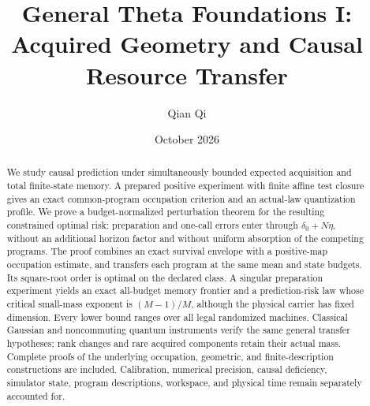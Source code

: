 \documentclass[11pt,reqno]{amsart}
\title[Acquired geometry and causal resource transfer]{General Theta Foundations I:\\Acquired Geometry and Causal Resource Transfer}
\author{Qian Qi}
\date{October 2026}
\numberwithin{equation}{section}
\theoremstyle{definition}
\theoremstyle{remark}
\begin{document}
\begin{abstract}
We study causal prediction under simultaneously bounded expected acquisition and total finite-state memory. A prepared positive experiment with finite affine test closure gives an exact common-program occupation criterion and an actual-law quantization profile. We prove a budget-normalized perturbation theorem for the resulting constrained optimal risk: preparation and one-call errors enter through $\delta_0+N\eta$, without an additional horizon factor and without uniform absorption of the competing programs. The proof combines an exact survival envelope with a positive-map occupation estimate, and transfers each program at the same mean and state budgets. Its square-root order is optimal on the declared class. A singular preparation experiment yields an exact all-budget memory frontier and a prediction-risk law whose critical small-mass exponent is $(M-1)/M$, although the physical carrier has fixed dimension. Every lower bound ranges over all legal randomized machines. Classical Gaussian and noncommuting quantum instruments verify the same general transfer hypotheses; rank changes and rare acquired components retain their actual mass. Complete proofs of the underlying occupation, geometric, and finite-description constructions are included. Calibration, numerical precision, causal deficiency, simulator state, program descriptions, workspace, and physical time remain separately accounted for.
\end{abstract}
\maketitle












\appendix






\end{document}
